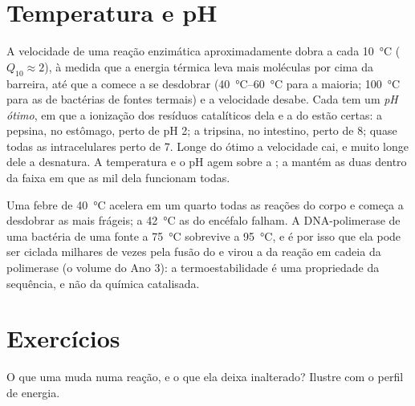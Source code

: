 \section{Temperatura e pH}

\begin{proposition}\label{prop:b1:enzymes:environment}
A velocidade de uma reação enzimática aproximadamente dobra a cada
\qty{10}{\celsius} ($Q_{10} \approx 2$), à medida que a energia térmica
leva mais moléculas por cima da barreira, até que a  comece a se
desdobrar (\qtyrange{40}{60}{\celsius} para a maioria;
\qty{100}{\celsius} para as  de bactérias de fontes termais) e a
velocidade desabe. Cada  tem um \emph{pH ótimo}, em que a
ionização dos resíduos catalíticos dela e a do  estão certas: a
pepsina, no estômago, perto de pH 2; a tripsina, no intestino, perto de
8; quase todas as  intracelulares perto de 7. Longe do ótimo a
velocidade cai, e muito longe dele a  desnatura. A temperatura e
o pH agem sobre a ; a  mantém as duas dentro da faixa em
que as mil  dela funcionam todas.
\end{proposition}

\begin{example}\label{ex:b1:enzymes:fever}
Uma febre de \qty{40}{\celsius} acelera em um quarto todas as reações do
corpo e começa a desdobrar as  mais frágeis; a
\qty{42}{\celsius} as do encéfalo falham. A DNA-polimerase de uma
bactéria de uma fonte a \qty{75}{\celsius} sobrevive a
\qty{95}{\celsius}, e é por isso que ela pode ser ciclada milhares de
vezes pela fusão do  e virou a  da reação em cadeia da
polimerase (o volume do Ano 3): a termoestabilidade é uma propriedade da
sequência, e não da química catalisada.
\end{example}

\section{Exercícios}

\begin{exercise}[$\star$]\label{exo:b1:enzymes:1}
O que uma  muda numa reação, e o que ela deixa inalterado?
Ilustre com o perfil de energia.
\end{exercise}

